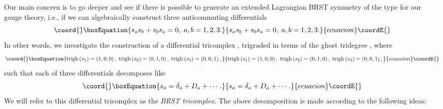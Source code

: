 \documentclass[a4paper,12pt]{article}
\begin{document}
Our main concern is to go deeper and see if there is possible to generate an
extended Lagrangian BRST symmetry of the type \coordHE{} for our gauge theory,
i.e., if we can algebraically construct three anticommuting differentials \coordHE{} 
\begin{equation}\coord{}\boxEquation{
s_{a}s_{b}+s_{b}s_{a}=0,\;a,b=1,2,3.  \label{sp3.8}
}{
s_{a}s_{b}+s_{b}s_{a}=0,\;a,b=1,2,3.  }{ecuacion}\coordE{}\end{equation}
In other words, we investigate the construction of a differential tricomplex 
\coordHE{}, trigraded in terms of the
ghost tridegree \coordHE{}, where 
\begin{equation}\coord{}\boxEquation{
\mathrm{trigh}\left( s_{1}\right) =\left( 1,0,0\right) ,\;\mathrm{trigh}
\left( s_{2}\right) =\left( 0,1,0\right) ,\;\mathrm{trigh}\left(
s_{3}\right) =\left( 0,0,1\right) ,  \label{sp3.9}
}{
\mathrm{trigh}\left( s_{1}\right) =\left( 1,0,0\right) ,\;\mathrm{trigh}
\left( s_{2}\right) =\left( 0,1,0\right) ,\;\mathrm{trigh}\left(
s_{3}\right) =\left( 0,0,1\right) ,  }{ecuacion}\coordE{}\end{equation}
such that each of three differentials decomposes like 
\begin{equation}\coord{}\boxEquation{
s_{a}=\delta _{a}+D_{a}+\cdots .  \label{sp3.10}
}{
s_{a}=\delta _{a}+D_{a}+\cdots .  }{ecuacion}\coordE{}\end{equation}
We will refer to this differential tricomplex as the \coordHE{} \textit{BRST
tricomplex}. The above decomposition is made according to the following
ideas:
\end{document}
